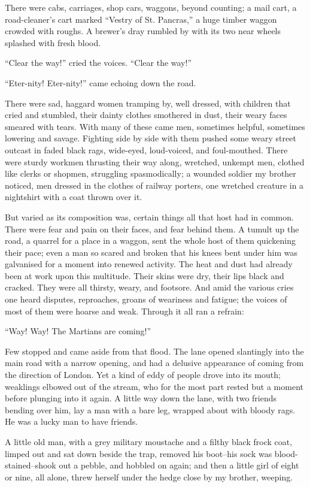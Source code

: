 There were cabs, carriages, shop cars, waggons, beyond counting; a
mail cart, a road-cleaner's cart marked ``Vestry of St. Pancras,'' a
huge timber waggon crowded with roughs. A brewer's dray rumbled by
with its two near wheels splashed with fresh blood.

``Clear the way!'' cried the voices. ``Clear the way!''

``Eter-nity! Eter-nity!'' came echoing down the road.

There were sad, haggard women tramping by, well dressed, with
children that cried and stumbled, their dainty clothes smothered in
dust, their weary faces smeared with tears. With many of these came
men, sometimes helpful, sometimes lowering and savage. Fighting
side by side with them pushed some weary street outcast in faded
black rags, wide-eyed, loud-voiced, and foul-mouthed. There were
sturdy workmen thrusting their way along, wretched, unkempt men,
clothed like clerks or shopmen, struggling spasmodically; a wounded
soldier my brother noticed, men dressed in the clothes of railway
porters, one wretched creature in a nightshirt with a coat thrown
over it.

But varied as its composition was, certain things all that host had
in common. There were fear and pain on their faces, and fear behind
them. A tumult up the road, a quarrel for a place in a waggon, sent
the whole host of them quickening their pace; even a man so scared
and broken that his knees bent under him was galvanised for a
moment into renewed activity. The heat and dust had already been at
work upon this multitude. Their skins were dry, their lips black
and cracked. They were all thirsty, weary, and footsore. And amid
the various cries one heard disputes, reproaches, groans of
weariness and fatigue; the voices of most of them were hoarse and
weak. Through it all ran a refrain:

``Way! Way! The Martians are coming!''

Few stopped and came aside from that flood. The lane opened
slantingly into the main road with a narrow opening, and had a
delusive appearance of coming from the direction of London. Yet a
kind of eddy of people drove into its mouth; weaklings elbowed out
of the stream, who for the most part rested but a moment before
plunging into it again. A little way down the lane, with two
friends bending over him, lay a man with a bare leg, wrapped about
with bloody rags. He was a lucky man to have friends.

A little old man, with a grey military moustache and a filthy black
frock coat, limped out and sat down beside the trap, removed his
boot--his sock was blood-stained--shook out a pebble, and hobbled
on again; and then a little girl of eight or nine, all alone, threw
herself under the hedge close by my brother, weeping.


